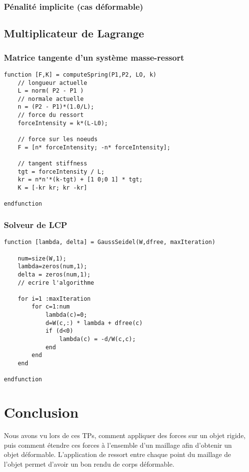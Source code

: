\documentclass[a4paper,11pt]{article}
\begin{document}
\subsubsection{Pénalité implicite (cas déformable)}

\subsection{Multiplicateur de Lagrange}
\subsubsection{Matrice tangente d'un système masse-ressort}
\begin{lstlisting}[caption=Calcul de matrice tangente du système]
  function [F,K] = computeSpring(P1,P2, LO, k)
	// longueur actuelle
	L = norm( P2 - P1 )
	// normale actuelle
	n = (P2 - P1)*(1.0/L);
	// force du ressort
	forceIntensity = k*(L-L0);

	// force sur les noeuds
	F = [n* forceIntensity; -n* forceIntensity];

	// tangent stiffness 
    tgt = forceIntensity / L;
    kr = n*n'*(k-tgt) + [1 0;0 1] * tgt;
    K = [-kr kr; kr -kr]

endfunction
\end{lstlisting}
\subsubsection{Solveur de LCP}
\begin{lstlisting}[caption=Calcul de l'intensité des forces de contact]
  function [lambda, delta] = GaussSeidel(W,dfree, maxIteration)
    
    num=size(W,1);
    lambda=zeros(num,1);
    delta = zeros(num,1);
    // ecrire l'algorithme
    
    for i=1 :maxIteration
        for c=1:num
            lambda(c)=0;
            d=W(c,:) * lambda + dfree(c)
            if (d<0)
                lambda(c) = -d/W(c,c);
            end
        end
    end
    
endfunction
\end{lstlisting}
\section{Conclusion}
Nous avons vu lors de ces TPs, comment appliquer des forces sur un objet rigide, puis comment
étendre ces forces à l'ensemble d'un maillage afin d'obtenir un objet déformable. L'application
de ressort entre chaque point du maillage de l'objet permet d'avoir un bon rendu de corps déformable.
\end{document}
